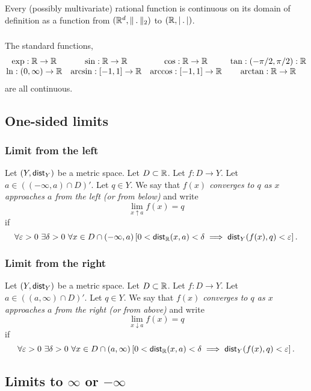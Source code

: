 \subsubsection*{}
\uprop Every (possibly multivariate) rational function is continuous on its
domain of definition as a function from  $(\R^d, \norm_2)$ to $(\R, \normR)$.

\subsubsection*{}
\uprop The standard functions,
\[ \begin{matrix}
    \exp : \mathbb{R} \to \mathbb{R} & \sin : \mathbb{R} \to \mathbb{R} & \cos : \mathbb{R} \to \mathbb{R} & \tan : (-\pi/2, \pi/2) : \mathbb{R} \\
    \ln : (0, \infty) \to \mathbb{R} & \arcsin : [-1,1] \to \mathbb{R} & \arccos : [-1,1] \to \mathbb{R} & \arctan : \mathbb{R} \to \mathbb{R}
\end{matrix} \]
are all continuous.


\subsection{One-sided limits}
\subsubsection*{Limit from the left}
Let $(Y, \mathsf{dist}_Y)$ be a metric space. Let $D \subset \mathbb{R}$. Let $f : D \to Y$.
Let $a \in ((-\infty, a) \cap D)'$. Let $q \in Y$. We say that
\emph{$f(x)$ converges to $q$ as $x$ approaches $a$ from the left (or from below)}
and write
\[
    \lim_{x \uparrow a} f(x) = q
\]
if
\[
    \forall \varepsilon > 0\ \exists \delta > 0\ \forall x \in D \cap (-\infty, a)
        \left[ 0 < \mathsf{dist}_{\mathbb{R}}(x,a) < \delta \implies \mathsf{dist}_Y(f(x), q) < \varepsilon \right].
\]

\subsubsection*{Limit from the right}
Let $(Y, \mathsf{dist}_Y)$ be a metric space. Let $D \subset \mathbb{R}$. Let $f : D \to Y$.
Let $a \in ((a, \infty) \cap D)'$. Let $q \in Y$. We say that
\emph{$f(x)$ converges to $q$ as $x$ approaches $a$ from the right (or from above)}
and write
\[
    \lim_{x \downarrow a} f(x) = q
\]
if
\[
    \forall \varepsilon > 0\ \exists \delta > 0\ \forall x \in D \cap (a, \infty)
        \left[ 0 < \mathsf{dist}_{\mathbb{R}}(x,a) < \delta \implies \mathsf{dist}_Y(f(x), q) < \varepsilon \right].
\]

\subsection{Limits to $\infty$ or $-\infty$}
